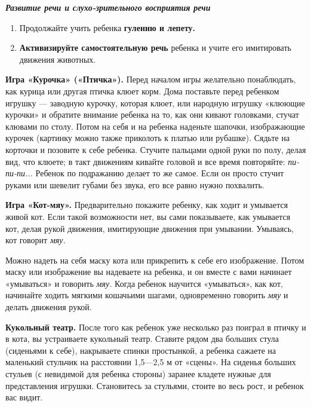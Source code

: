 \documentclass[a5paper]{book}
\renewcommand{\emph}[1]{\textit{#1}}
\begin{document}
\emph{\textbf{Развитие речи и слухо-зрительного восприятия речи}}


\begin{enumerate}
\def\labelenumi{\arabic{enumi}.}
\item
  
  Продолжайте учить ребенка \textbf{гулению и лепету.}
  
\item
  
  \textbf{Активизируйте самостоятельную речь} ребенка и учите его
  имитировать движения животных.
  
\end{enumerate}


\textbf{Игра «Курочка» («Птичка»).} Перед началом игры желательно
понаблюдать, как курица или другая птичка клюет корм. Дома поставьте
перед ребенком игрушку --- заводную курочку, которая клюет, или народную
игрушку «клюющие курочки» и обратите внимание ребенка на то, как они
кивают головками, стучат клювами по столу. Потом на себя и на ребенка
наденьте шапочки, изображающие курочек (картинку можно также приколоть к
платью или рубашке). Сядьте на корточки и позовите к себе ребенка.
Стучите пальцами одной руки по полу, делая вид, что клюете; в такт
движениям кивайте головой и все время повторяйте: \emph{пи-пи-пи...}
Ребенок по подражанию делает то же самое. Если он просто стучит руками
или шевелит губами без звука, его все равно нужно похвалить.

\textbf{Игра «Кот-мяу».} Предварительно покажите ребенку, как ходит и
умывается живой кот. Если такой возможности нет, вы сами показываете,
как умывается кот, делая рукой движения, имитирующие движения при
умывании. Умываясь, кот говорит \emph{мяу.}

Можно надеть на себя маску кота или прикрепить к себе его изображение.
Потом маску или изображение вы надеваете на ребенка, и он вместе с вами
начинает «умываться» и говорить \emph{мяу.} Когда ребенок научится
«умываться», как кот, начинайте ходить мягкими кошачьими шагами,
одновременно говорить \emph{мяу} и делать движения рукой.

\textbf{Кукольный театр.} После того как ребенок уже несколько раз
поиграл в птичку и в кота, вы устраиваете кукольный театр. Ставите рядом
два больших стула (сиденьями к себе), накрываете спинки простынкой, а
ребенка сажаете на маленький стульчик на расстоянии 1,5---2,5 м от
«сцены». На сиденья больших стульев (с невидимой для ребенка стороны)
заранее кладете нужные для представления игрушки. Становитесь за
стульями, стоите во весь рост, и ребенок вас видит.
\end{document}
